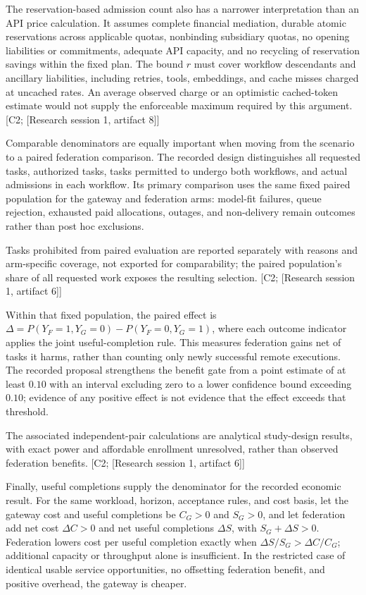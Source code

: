 \documentclass[11pt]{article}
\begin{document}
The reservation-based admission count also has a narrower interpretation than an API price calculation. It assumes complete financial mediation, durable atomic reservations across applicable quotas, nonbinding subsidiary quotas, no opening liabilities or commitments, adequate API capacity, and no recycling of reservation savings within the fixed plan. The bound $r$ must cover workflow descendants and ancillary liabilities, including retries, tools, embeddings, and cache misses charged at uncached rates. An average observed charge or an optimistic cached-token estimate would not supply the enforceable maximum required by this argument. [C2; [Research session 1, artifact 8]]

Comparable denominators are equally important when moving from the scenario to a paired federation comparison. The recorded design distinguishes all requested tasks, authorized tasks, tasks permitted to undergo both workflows, and actual admissions in each workflow. Its primary comparison uses the same fixed paired population for the gateway and federation arms: model-fit failures, queue rejection, exhausted paid allocations, outages, and non-delivery remain outcomes rather than post hoc exclusions.

Tasks prohibited from paired evaluation are reported separately with reasons and arm-specific coverage, not exported for comparability; the paired population's share of all requested work exposes the resulting selection. [C2; [Research session 1, artifact 6]]

Within that fixed population, the paired effect is $\Delta=P(Y_F=1,Y_G=0)-P(Y_F=0,Y_G=1)$, where each outcome indicator applies the joint useful-completion rule. This measures federation gains net of tasks it harms, rather than counting only newly successful remote executions. The recorded proposal strengthens the benefit gate from a point estimate of at least $0.10$ with an interval excluding zero to a lower confidence bound exceeding $0.10$; evidence of any positive effect is not evidence that the effect exceeds that threshold.

The associated independent-pair calculations are analytical study-design results, with exact power and affordable enrollment unresolved, rather than observed federation benefits. [C2; [Research session 1, artifact 6]]

Finally, useful completions supply the denominator for the recorded economic result. For the same workload, horizon, acceptance rules, and cost basis, let the gateway cost and useful completions be $C_G>0$ and $S_G>0$, and let federation add net cost $\Delta C>0$ and net useful completions $\Delta S$, with $S_G+\Delta S>0$. Federation lowers cost per useful completion exactly when $\Delta S/S_G>\Delta C/C_G$; additional capacity or throughput alone is insufficient. In the restricted case of identical usable service opportunities, no offsetting federation benefit, and positive overhead, the gateway is cheaper.
\end{document}

